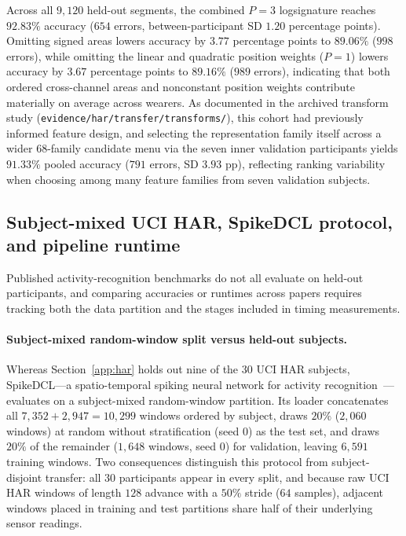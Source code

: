 Across all \(9{,}120\) held-out segments, the combined \(P = 3\) logsignature
reaches \(92.83\%\) accuracy (\(654\) errors, between-participant SD \(1.20\)
percentage points). Omitting signed areas lowers accuracy by \(3.77\) percentage
points to \(89.06\%\) (\(998\) errors), while omitting the linear and quadratic
position weights (\(P = 1\)) lowers accuracy by \(3.67\) percentage points to
\(89.16\%\) (\(989\) errors), indicating that both ordered cross-channel areas and
nonconstant position weights contribute materially on average across wearers. As
documented in the archived transform study (\nolinkurl{evidence/har/transfer/transforms/}),
this cohort had previously informed feature design, and selecting the
representation family itself across a wider \(68\)-family candidate menu via the
seven inner validation participants yields \(91.33\%\) pooled accuracy (\(791\)
errors, SD \(3.93\) pp), reflecting ranking variability when choosing among many
feature families from seven validation subjects.

\subsection{Subject-mixed UCI HAR, SpikeDCL protocol, and pipeline runtime}
\label{app:compute}
Published activity-recognition benchmarks do not all evaluate on held-out
participants, and comparing accuracies or runtimes across papers requires
tracking both the data partition and the stages included in timing measurements.

\paragraph{Subject-mixed random-window split versus held-out subjects.}
Whereas Section~\ref{app:har} holds out nine of the \(30\) UCI HAR subjects,
SpikeDCL---a spatio-temporal spiking neural network for activity
recognition~\cite{spikedcl}---evaluates on a subject-mixed random-window
partition. Its loader concatenates all \(7{,}352 + 2{,}947 = 10{,}299\) windows
ordered by subject, draws \(20\%\) (\(2{,}060\) windows) at random without
stratification (seed \(0\)) as the test set, and draws \(20\%\) of the remainder
(\(1{,}648\) windows, seed \(0\)) for validation, leaving \(6{,}591\) training
windows. Two consequences distinguish this protocol from subject-disjoint
transfer: all \(30\) participants appear in every split, and because raw UCI HAR
windows of length \(128\) advance with a \(50\%\) stride (\(64\) samples),
adjacent windows placed in training and test partitions share half of their
underlying sensor readings.

